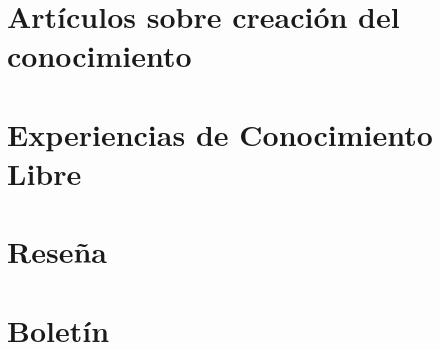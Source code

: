 \documentclass[12pt,letterpaper]{book}
\begin{document}
\hojaportada
\hojalicencia

\tablacontenido
\hojapresentacion
\hojaeditorial
\mainmatter
\fancychapterstyle

\chapter{Artículos sobre creación del conocimiento}


\chapter{Experiencias de Conocimiento Libre}
%

\chapter{Reseña}
%

\chapter{Boletín}
%

\hojacontraportada
\end{document}

